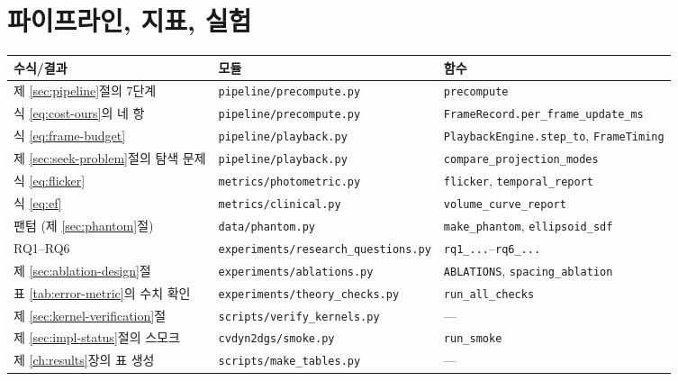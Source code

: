 \section{파이프라인, 지표, 실험}

\begin{longtable}{@{}p{3.6cm}p{4.6cm}p{5.2cm}@{}}
\toprule
수식/결과 & 모듈 & 함수 \\
\midrule
\endhead
제 \ref{sec:pipeline}절의 7단계 & \texttt{pipeline/precompute.py} & \texttt{precompute} \\
식 \eqref{eq:cost-ours}의 네 항 & \texttt{pipeline/precompute.py}
  & \texttt{FrameRecord.per\_frame\_update\_ms} \\
식 \eqref{eq:frame-budget} & \texttt{pipeline/playback.py}
  & \texttt{PlaybackEngine.step\_to}, \texttt{FrameTiming} \\
제 \ref{sec:seek-problem}절의 탐색 문제 & \texttt{pipeline/playback.py}
  & \texttt{compare\_projection\_modes} \\
식 \eqref{eq:flicker} & \texttt{metrics/photometric.py} & \texttt{flicker}, \texttt{temporal\_report} \\
식 \eqref{eq:ef} & \texttt{metrics/clinical.py} & \texttt{volume\_curve\_report} \\
팬텀 (제 \ref{sec:phantom}절) & \texttt{data/phantom.py}
  & \texttt{make\_phantom}, \texttt{ellipsoid\_sdf} \\
RQ1--RQ6 & \texttt{experiments/research\_questions.py} & \texttt{rq1\_...}--\texttt{rq6\_...} \\
제 \ref{sec:ablation-design}절 & \texttt{experiments/ablations.py}
  & \texttt{ABLATIONS}, \texttt{spacing\_ablation} \\
표 \ref{tab:error-metric}의 수치 확인 & \texttt{experiments/theory\_checks.py}
  & \texttt{run\_all\_checks} \\
제 \ref{sec:kernel-verification}절 & \texttt{scripts/verify\_kernels.py} & --- \\
제 \ref{sec:impl-status}절의 스모크 & \texttt{cvdyn2dgs/smoke.py} & \texttt{run\_smoke} \\
제 \ref{ch:results}장의 표 생성 & \texttt{scripts/make\_tables.py} & --- \\
\bottomrule
\end{longtable}
